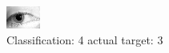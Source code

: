 \begin{figure}[h!]
\begin{center}
\includegraphics[width=0.60\columnwidth]{figures/ID1277_class_4_target_3.png}
\end{center}
\caption{ Classification: 4 actual target: 3}
\label{fig:ID1277_class_4_target_3}
\end{figure}
